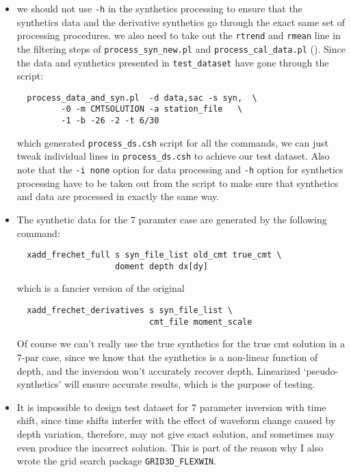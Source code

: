 \documentclass[12pt,titlepage,fleqn]{article}
\begin{document}
\begin{itemize}
\item  {} we should not use \verb=-h= in the synthetics processing to ensure that the synthetics data and the derivative synthetics go through the exact same set of processing procedures. we also need to take out the \verb=rtrend= and \verb=rmean= line in the filtering steps of \verb=process_syn_new.pl= and \verb=process_cal_data.pl= (). Since the data and synthetics presented in \verb=test_dataset= have gone through the script:
\begin{verbatim}
  process_data_and_syn.pl  -d data,sac -s syn,  \
         -0 -m CMTSOLUTION -a station_file   \
         -1 -b -26 -2 -t 6/30
\end{verbatim}
which generated \verb=process_ds.csh= script for all the commands, we can just tweak individual lines in \verb=process_ds.csh= to achieve our test dataset. Also
note that the \verb=-i none= option for data processing and \verb=-h= option for synthetics processing have to be taken out from the script to make sure that synthetics and data are processed in exactly the same way.

\item The synthetic data for the 7 paramter case are generated by the following command:
\begin{verbatim}
  xadd_frechet_full s syn_file_list old_cmt true_cmt \
                    doment depth dx[dy]
\end{verbatim}
which is a fancier version of the original
\begin{verbatim}
  xadd_frechet_derivatives s syn_file_list \
                           cmt_file moment_scale
\end{verbatim}
Of course we can't really use the true synthetics for the true cmt solution in a 7-par case, since we know that the synthetics is a non-linear function of depth, and the inversion won't accurately recover depth. Linearized `pseudo-synthetics' will ensure accurate results, which is the purpose of testing.

\item It is impossible to design test dataset for 7 parameter inversion with time shift, since time shifts interfer with the effect of waveform change caused by depth variation, therefore, may not give exact solution, and sometimes may even produce the incorrect solution. This is part of the reason why I also wrote the grid search package \verb=GRID3D_FLEXWIN=.
\end{itemize}
\end{document}
